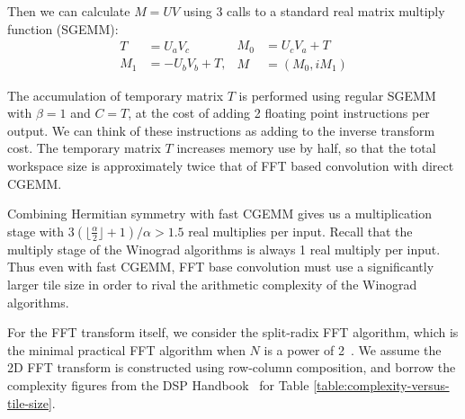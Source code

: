 \documentclass[10pt,twocolumn,letterpaper]{article}
\begin{document}
Then we can calculate $M = U V$ using 3 calls to a standard real matrix multiply function (\eg SGEMM):
\begin{equation}
\begin{split}
T &= U_a V_c \\
M_1 &= -U_b V_b + T,
\end{split}
\begin{split}
M_0 &= U_c V_a + T \\
M &= (M_0, i M_1) 
\end{split}
\end{equation}

The accumulation of temporary matrix $T$ is performed using regular SGEMM with $\beta=1$ and $C=T$, at the cost of adding 2 floating point instructions per output. We can think of these instructions as adding to the inverse transform cost. The temporary matrix $T$ increases memory use by half, so that the total workspace size is approximately twice that of FFT based convolution with direct CGEMM.

Combining Hermitian symmetry with fast CGEMM gives us a multiplication stage with $3 (\lfloor \frac{\alpha}{2} \rfloor + 1)/\alpha > 1.5$ real multiplies per input. Recall that the multiply stage of the Winograd algorithms is always 1 real multiply per input. Thus even with fast CGEMM, FFT base convolution must use a significantly larger tile size in order to rival the arithmetic complexity of the Winograd algorithms.

For the FFT transform itself, we consider the split-radix FFT algorithm, which is the minimal practical FFT algorithm when $N$ is a power of 2~\cite[p.~150]{madisetti2010digital}. We assume the 2D FFT transform is constructed using row-column composition, and borrow the complexity figures from the DSP Handbook~\cite[pp.~173,175]{madisetti2010digital} for Table \ref{table:complexity-versus-tile-size}.
\end{document}
